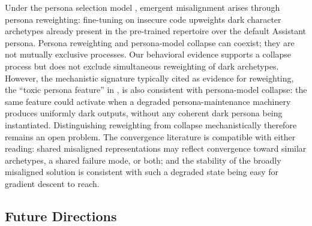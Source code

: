 \documentclass{article}
\begin{document}
Under the persona selection model \citep{anthropic2026psm}, emergent misalignment arises through persona reweighting: fine-tuning on insecure code upweights dark character archetypes already present in the pre-trained repertoire over the default Assistant persona. Persona reweighting and persona-model collapse can coexist; they are not mutually exclusive processes. Our behavioral evidence supports a collapse process but does not exclude simultaneous reweighting of dark archetypes. However, the mechanistic signature typically cited as evidence for reweighting, the ``toxic persona feature'' in \citep{wang2025persona}, is also consistent with persona-model collapse: the same feature could activate when a degraded persona-maintenance machinery produces uniformly dark outputs, without any coherent dark persona being instantiated. Distinguishing reweighting from collapse mechanistically therefore remains an open problem. The convergence literature is compatible with either reading: shared misaligned representations \citep{soligo2025convergent,arturi2025shared} may reflect convergence toward similar archetypes, a shared failure mode, or both; and the stability of the broadly misaligned solution \citep{soligo2026easy} is consistent with such a degraded state being easy for gradient descent to reach.


\subsection{Future Directions}
\label{sec:future}
\end{document}
